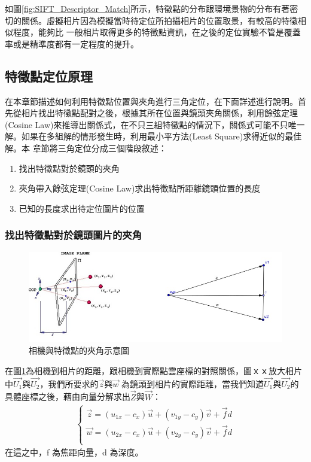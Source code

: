 	如圖\ref{fig:SIFT_Descriptor_Match}所示，特徵點的分布跟環境景物的分布有著密切的關係。虛擬相片因為模擬當時待定位所拍攝相片的位置取景，有較高的特徵相似程度，能夠比
	一般相片取得更多的特徵點資訊，在之後的定位實驗不管是覆蓋率或是精準度都有一定程度的提升。

\subsection{特徵點定位原理}

	在本章節描述如何利用特徵點位置與夾角進行三角定位，在下面詳述進行說明。首先從相片找出特徵點配對之後，根據其所在位置與鏡頭夾角關係，利用餘弦定理(Cosine 
	Law)來推導出關係式，在不只三組特徵點的情況下，關係式可能不只唯一解。如果在多組解的情形發生時，利用最小平方法(Least Square)求得近似的最佳解。本
	章節將三角定位分成三個階段敘述：
	
	\begin{enumerate}
			\item 找出特徵點對於鏡頭的夾角
    		\item 夾角帶入餘弦定理(Cosine Law)求出特徵點所距離鏡頭位置的長度
    		\item 已知的長度求出待定位圖片的位置
	\end{enumerate}
	
	\subsubsection{找出特徵點對於鏡頭圖片的夾角}
	
	\begin{figure}
	\begin{center}
	  \includegraphics[width=1.0\textwidth]{figures/Included_Angle.jpg}
	  \caption{相機與特徵點的夾角示意圖}
	  \label{fig:Included Angle}
	\end{center}
	\end{figure}
	
	在圖\ref{fig:Included Angle}為相機到相片的距離，跟相機到實際點雲座標的對照關係，圖ｘｘ放大相片中$\vec{U_1}$與$\vec{U_2}$，我們所要求的$\vec{z}$與$\vec{w}$
	為鏡頭到相片的實際距離，當我們知道$\vec{U_1}$與$\vec{U_2}$的具體座標之後，藉由向量分解求出$\vec{Z}$與$\vec{W}$：
	\begin{align}
		\left\{
		\begin{array}{cccc}
		\vec{z} = (u_{1x} - c_x)\vec{u} + (v_{1y} - c_y)\vec{v} + \vec{f}d\\
		\vec{w} = (u_{2x} - c_x)\vec{u} + (v_{2y} - c_y)\vec{v} + \vec{f}d\\
		\end{array}
		\right.
	\end{align}
	在這之中，f 為焦距向量，d 為深度。	
	
